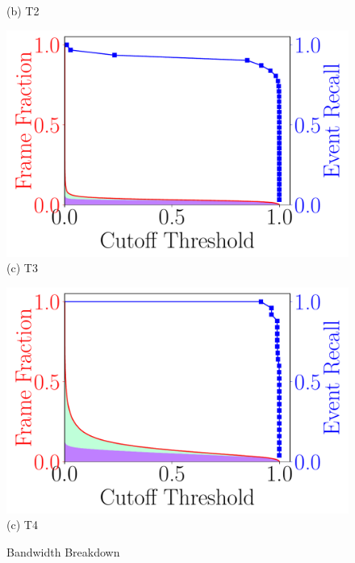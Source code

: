 \begin{figure}
\begin{minipage}[]{0.45\linewidth}
{(b) T2}
\end{minipage}

\vspace{.5in}

\begin{minipage}[]{0.45\linewidth}
\centering
    \includegraphics[width=\linewidth]{FIGS/fig-event-recall-frame-percentage-vs-threshold-raft.pdf}\\
{(c) T3}
\end{minipage}
\begin{minipage}[]{0.45\linewidth}
\centering
    \includegraphics[width=\linewidth]{FIGS/fig-event-recall-frame-percentage-vs-threshold-elephant.pdf}\\
{(c) T4}
\end{minipage}

    \vspace{.5in}
\caption{Bandwidth Breakdown}
\label{fig:earlydiscard-frame-percent-breakdown}
\end{figure}

